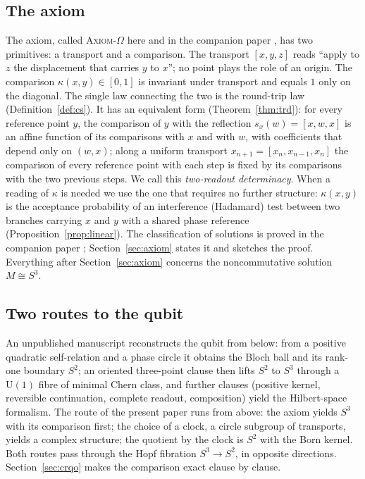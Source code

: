 \documentclass[aps,pra,onecolumn,superscriptaddress,nofootinbib,10pt]{revtex4-2}
\theoremstyle{definition}
\theoremstyle{remark}
\newcommand{\hp}[3]{[#1,#2,#3]}
\newcommand{\U}{\mathrm{U}}
\newcommand{\PI}{\cite{PaperI}}
\begin{document}
\subsection{The axiom}
The axiom, called \textsc{Axiom}-$\Omega$ here and in the companion paper \PI, has
two primitives: a transport and a comparison.  The transport $\hp{x}{y}{z}$ reads ``apply to $z$ the
displacement that carries $y$ to $x$''; no point plays the role of an origin.  The comparison
$\kappa(x,y)\in[0,1]$ is invariant under transport and equals $1$ only on the diagonal.  The single law
connecting the two is the round-trip law (Definition~\ref{def:cs}).  It has an equivalent form
(Theorem~\ref{thm:trd}): for every reference point $y$, the comparison of $y$ with the reflection
$s_x(w)=\hp{x}{w}{x}$ is an affine function of its comparisons with $x$ and with $w$, with coefficients
that depend only on $(w,x)$; along a uniform transport $x_{n+1}=\hp{x_n}{x_{n-1}}{x_n}$ the comparison of
every reference point with each step is fixed by its comparisons with the two previous steps.  We call
this \emph{two-readout determinacy}.  When a reading of $\kappa$ is needed we use the one that requires
no further structure: $\kappa(x,y)$ is the acceptance probability of an interference (Hadamard) test
between two branches carrying $x$ and $y$ with a shared phase reference
(Proposition~\ref{prop:linear}).  The
classification of solutions is proved in the companion paper \PI; Section~\ref{sec:axiom} states it
and sketches the proof.  Everything after Section~\ref{sec:axiom} concerns the noncommutative solution
$M\cong S^3$.

\subsection{Two routes to the qubit}
An unpublished manuscript \cite{CRQO} reconstructs the qubit from below: from a positive quadratic
self-relation and a phase circle it obtains the Bloch ball and its rank-one boundary $S^2$; an
oriented three-point clause then lifts $S^2$ to $S^3$ through a $\U(1)$ fibre of minimal Chern class,
and further clauses (positive kernel, reversible continuation, complete readout, composition) yield
the Hilbert-space formalism.  The route of the present paper runs from above: the axiom yields $S^3$
with its comparison first; the choice of a clock, a circle subgroup of transports, yields a complex
structure; the quotient by the clock is $S^2$ with the Born kernel.  Both routes pass through the
Hopf fibration $S^3\to S^2$, in opposite directions.  Section~\ref{sec:crqo} makes the comparison
exact clause by clause.
\end{document}
